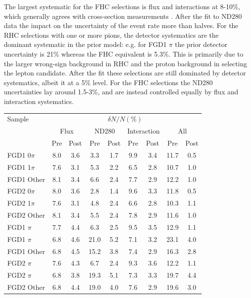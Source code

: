 The largest systematic for the FHC selections is flux and interactions at 8-10\%, which generally agrees with cross-section measurements . After the fit to ND280 data the impact on the uncertainty of the event rate more than halves. For the RHC selections with one or more pions, the detector systematics are the dominant systematic in the prior model: e.g. for FGD1 $\pi$ the prior detector uncertainty is 21\% whereas the FHC equivalent is 5.3\%. This is primarily due to the larger wrong-sign background in RHC and the proton background in selecting the lepton candidate. After the fit these selections are still dominated by detector systematics, albeit it at a 5\% level. For the FHC selections the ND280 uncertainties lay around 1.5-3\%, and are instead controlled equally by flux and interaction systematics.
\begin{table}
	\begin{tabular}{l | c c | c c | c c | c c}
		\hline
		\hline 
		Sample & \multicolumn{8}{c}{$\delta N/N (\%)$} \\
		& \multicolumn{2}{c|}{Flux} & \multicolumn{2}{c|}{ND280} & \multicolumn{2}{c|}{Interaction} & \multicolumn{2}{c}{All} \\
		& Pre & Post & Pre & Post & Pre & Post & Pre & Post \\
		\hline
		FGD1 0$\pi$ & 8.0 & 3.6 & 3.3 & 1.7 & 9.9 & 3.4 & 11.7 & 0.5\\
		FGD1 1$\pi$ & 7.6 & 3.1 & 5.3 & 2.2 & 6.5 & 2.8 & 10.7 & 1.0 \\
		FGD1 Other & 8.1 & 3.4 & 6.6 & 2.4 & 7.7 & 2.9 & 12.2 & 1.0 \\
		FGD2 0$\pi$ & 8.0 & 3.6 & 2.8 & 1.4 & 9.6 & 3.3 & 11.8 & 0.5 \\
		FGD2 1$\pi$ & 7.6 & 3.1 & 4.8 & 2.4 & 6.6 & 2.8 & 10.3 & 1.1 \\
		FGD2 Other & 8.1 & 3.4 & 5.5 & 2.4 & 7.8 & 2.9 & 11.6 & 1.0 \\
		\hline
		FGD1 \numubar 0$\pi$ & 7.7 & 4.4 & 6.3 & 2.5 & 9.5 & 3.5 & 12.9 & 1.1 \\
		FGD1 \numubar 1$\pi$ & 6.8 & 4.6 & 21.0 & 5.2 & 7.1 & 3.2 & 23.1 & 4.0 \\
		FGD1 \numubar Other & 6.8 & 4.5 & 15.2 & 3.8 & 7.4 & 2.9 & 16.3 & 2.8 \\
		FGD2 \numubar 0$\pi$ & 7.6 & 4.3 &  6.7 & 2.4 & 9.3 & 3.6 & 12.2 & 1.1 \\
		FGD2 \numubar 1$\pi$ & 6.8 & 3.8 & 19.3 & 5.1 & 7.3 & 3.3 & 19.7 & 4.4 \\
		FGD2 \numubar Other & 6.8 & 4.4 & 19.0 & 4.0 & 7.6 & 2.9 & 19.6 & 3.0 \\

\end{tabular}
\end{table}
